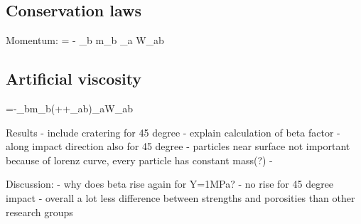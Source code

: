 \subsection{Conservation laws}
Momentum:
 = -  \sum \limits_{b} m_{b}  \nabla_{a} W_{ab}

\subsection{Artificial viscosity}

{=-\sum \limits _{b}m_{b}\left({}+{}+\Pi _{ab}\right)\nabla _{a}W_{ab}}


Results
- include cratering for 45 degree
- explain calculation of beta factor
- along impact direction also for 45 degree
- particles near surface not important because of lorenz curve, every particle has constant mass(?)
-

Discussion:
- why does beta rise again for Y=1MPa?
- no rise for 45 degree impact
- overall a lot less difference between strengths and porosities than other research groups
